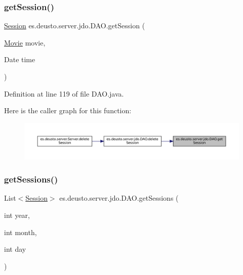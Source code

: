 \subsubsection{\texorpdfstring{getSession()}{getSession()}}
{\footnotesize\ttfamily \mbox{\hyperlink{classes_1_1deusto_1_1server_1_1jdo_1_1_session}{Session}} es.\+deusto.\+server.\+jdo.\+D\+A\+O.\+get\+Session (\begin{DoxyParamCaption}\item[{\mbox{\hyperlink{classes_1_1deusto_1_1server_1_1jdo_1_1_movie}{Movie}}}]{movie,  }\item[{Date}]{time }\end{DoxyParamCaption})}



Definition at line 119 of file D\+A\+O.\+java.

Here is the caller graph for this function\+:
\nopagebreak
\begin{figure}[H]
\begin{center}
\leavevmode
\includegraphics[width=350pt]{classes_1_1deusto_1_1server_1_1jdo_1_1_d_a_o_a34f9e5400280bbc1a9fce9143696470e_icgraph}
\end{center}
\end{figure}
\mbox{\label{classes_1_1deusto_1_1server_1_1jdo_1_1_d_a_o_a2f9f9eb5adc37f559d7fefe2da6544f1}} 
\subsubsection{\texorpdfstring{getSessions()}{getSessions()}}
{\footnotesize\ttfamily List$<$\mbox{\hyperlink{classes_1_1deusto_1_1server_1_1jdo_1_1_session}{Session}}$>$ es.\+deusto.\+server.\+jdo.\+D\+A\+O.\+get\+Sessions (\begin{DoxyParamCaption}\item[{int}]{year,  }\item[{int}]{month,  }\item[{int}]{day }\end{DoxyParamCaption})}



